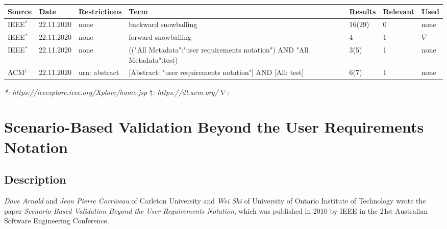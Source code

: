 \begin{table}[h]
	\caption{Literature Research Documentation.}
	\begin{longtable}{|p{1cm}|p{1.5cm}|>{\raggedright}p{2cm}|>{\raggedright}p{3.7cm}|p{1.3cm}|p{1.4cm}|p{0.7cm}|}
		\hline
		\textbf{Source} & \textbf{Date} & \textbf{Restrictions} & \textbf{Term} & \textbf{Results} & \textbf{Relevant} & \textbf{Used}\\
		\hline
		IEEE$^*$ & 22.11.2020 & none & backward snowballing & 16(29) & 0 & none \\
		\hline
		IEEE$^*$ & 22.11.2020 & none & forward snowballing & 4 & 1 & $\nabla$ \\
		\hline
		IEEE$^*$ & 22.11.2020 & none & (("All Metadata":"user requirements notation") AND "All Metadata":test) & 3(5) & 1 & none\\
		\hline
		ACM$^\dagger$ & 22.11.2020 & urn: abstract & [Abstract: "user requirements notation"] AND [All: test] & 6(7) & 1 & none \\
		\hline
	\end{longtable}
	\textit{*: https://ieeexplore.ieee.org/Xplore/home.jsp \quad $\dagger$: https://dl.acm.org/ \quad $\nabla$: \cite{BoucherMussbacher2017}}
	\label{tab:08_research}
\end{table}
\newpage
\section{Scenario-Based Validation Beyond the User Requirements Notation\cite{ArnoldCorriveauShi2010}}

\subsection{Description}

\textit{Dave Arnold} and \textit{Jean Pierre Corriveau} of Carleton University and \textit{Wei Shi} of University of Ontario Institute of Technology wrote the paper \textit{Scenario-Based Validation Beyond the User Requirements Notation}, which was published in 2010 by IEEE in the 21st Australian Software Engineering Conference.


